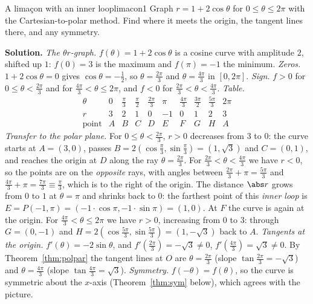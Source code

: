 \documentclass[11pt]{article}
\begin{document}
\begin{exmp}{A limaçon with an inner loop}{limacon1}
Graph $r=1+2\cos\theta$ for $0\le\theta\le2\pi$ with the Cartesian-to-polar method. Find where it meets the origin, the tangent lines there, and any symmetry.

\textbf{Solution.} \emph{The $\theta r$-graph.} $f(\theta)=1+2\cos\theta$ is a cosine curve with amplitude $2$, shifted up $1$: $f(0)=3$ is the maximum and $f(\pi)=-1$ the minimum. \emph{Zeros.} $1+2\cos\theta=0$ gives $\cos\theta=-\frac12$, so $\theta=\frac{2\pi}3$ and $\theta=\frac{4\pi}3$ in $[0,2\pi]$. \emph{Sign.} $f>0$ for $0\le\theta<\frac{2\pi}3$ and for $\frac{4\pi}3<\theta\le2\pi$, and $f<0$ for $\frac{2\pi}3<\theta<\frac{4\pi}3$.
\emph{Table.}
\[
\begin{array}{c|ccccccccc}
\theta&0&\frac\pi3&\frac\pi2&\frac{2\pi}3&\pi&\frac{4\pi}3&\frac{3\pi}2&\frac{5\pi}3&2\pi\\\hline
r&3&2&1&0&-1&0&1&2&3\\
\text{point}&A&B&C&D&E&F&G&H&A
\end{array}
\]
\emph{Transfer to the polar plane.} For $0\le\theta<\frac{2\pi}3$, $r>0$ decreases from $3$ to $0$: the curve starts at $A=(3,0)$, passes $B=2\left(\cos\frac\pi3,\sin\frac\pi3\right)=(1,\sqrt3)$ and $C=(0,1)$, and reaches the origin at $D$ along the ray $\theta=\frac{2\pi}3$. For $\frac{2\pi}3<\theta<\frac{4\pi}3$ we have $r<0$, so the points are on the \emph{opposite} rays, with angles between $\frac{2\pi}3+\pi=\frac{5\pi}3$ and $\frac{4\pi}3+\pi=\frac{7\pi}3\equiv\frac\pi3$, which is to the right of the origin. The distance $\abs r$ grows from $0$ to $1$ at $\theta=\pi$ and shrinks back to $0$: the farthest point of this \emph{inner loop} is $E=P(-1,\pi)=(-1\cdot\cos\pi,-1\cdot\sin\pi)=(1,0)$. At $F$ the curve is again at the origin. For $\frac{4\pi}3<\theta\le2\pi$ we have $r>0$, increasing from $0$ to $3$: through $G=(0,-1)$ and $H=2\left(\cos\frac{5\pi}3,\sin\frac{5\pi}3\right)=(1,-\sqrt3)$ back to $A$.
\emph{Tangents at the origin.} $f'(\theta)=-2\sin\theta$, and $f'\left(\frac{2\pi}3\right)=-\sqrt3\ne0$, $f'\left(\frac{4\pi}3\right)=\sqrt3\ne0$. By Theorem~\ref{thm:polpar} the tangent lines at $O$ are $\theta=\frac{2\pi}3$ (slope $\tan\frac{2\pi}3=-\sqrt3$) and $\theta=\frac{4\pi}3$ (slope $\tan\frac{4\pi}3=\sqrt3$). \emph{Symmetry.} $f(-\theta)=f(\theta)$, so the curve is symmetric about the $x$-axis (Theorem~\ref{thm:sym} below), which agrees with the picture.


\end{exmp}
\end{document}

